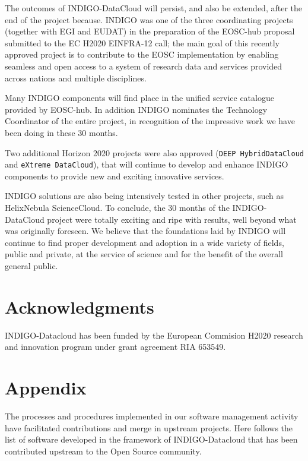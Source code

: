 \documentclass{article}
\begin{document}
{The outcomes of INDIGO-DataCloud will persist, and also be extended, after the end of the project because. INDIGO was one of the three coordinating projects (together with EGI and EUDAT) in the preparation of the EOSC-hub proposal submitted to the EC H2020 EINFRA-12 call; the main goal of this recently approved project is to contribute to the EOSC implementation by enabling seamless and open access to a system of research data and services provided across nations and multiple disciplines. 

Many INDIGO components will find place in the unified service catalogue provided by EOSC-hub. In addition INDIGO nominates the Technology Coordinator of the entire project, in recognition of the impressive work we have been doing in these 30 months. 

Two additional Horizon 2020 projects were also approved ({\tt DEEP HybridDataCloud} and {\tt eXtreme DataCloud}), that will continue to develop and enhance INDIGO components to provide new and exciting innovative services. 

INDIGO solutions are also being intensively tested in other projects, such as HelixNebula ScienceCloud. To conclude, the 30 months of the INDIGO-DataCloud project were totally exciting and ripe with results, well beyond what was originally foreseen. We believe that the foundations laid by INDIGO will continue to find proper development and adoption in a wide variety of fields, public and private, at the service of science and for the benefit of the overall general public.  

\section*{Acknowledgments}
INDIGO-Datacloud has been funded by the European Commision H2020 research and innovation program under grant agreement RIA 653549. 





\section*{Appendix}

The processes and procedures implemented in our software management activity have facilitated contributions and merge in upstream projects.
Here follows the list of software developed in the framework of INDIGO-Datacloud that has been contributed upstream to the Open Source community.


}
\end{document}

